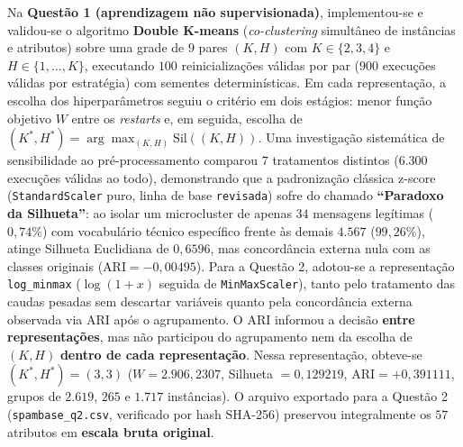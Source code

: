 \documentclass[a4paper,11pt]{article}
\begin{document}
Na \textbf{Questão 1 (aprendizagem não supervisionada)}, implementou-se e validou-se o algoritmo \textbf{Double K-means} (\textit{co-clustering} simultâneo de instâncias e atributos) sobre uma grade de $9$ pares $(K, H)$ com $K \in \{2, 3, 4\}$ e $H \in \{1, \ldots, K\}$, executando $100$ reinicializações válidas por par ($900$ execuções válidas por estratégia) com sementes determinísticas. Em cada representação, a escolha dos hiperparâmetros seguiu o critério em dois estágios: menor função objetivo $W$ entre os \textit{restarts} e, em seguida, escolha de $(K^*, H^*) = \arg\max_{(K,H)} \text{Sil}((K,H))$. Uma investigação sistemática de sensibilidade ao pré-processamento comparou $7$ tratamentos distintos ($6.300$ execuções válidas ao todo), demonstrando que a padronização clássica z-score (\texttt{StandardScaler} puro, linha de base \texttt{revisada}) sofre do chamado \textbf{``Paradoxo da Silhueta''}: ao isolar um microcluster de apenas $34$ mensagens legítimas ($0,74\%$) com vocabulário técnico específico frente às demais $4.567$ ($99,26\%$), atinge Silhueta Euclidiana de $0,6596$, mas concordância externa nula com as classes originais ($\text{ARI} = -0,00495$). Para a Questão 2, adotou-se a representação \texttt{log\_\allowbreak minmax} ($\log(1+x)$ seguida de \texttt{MinMaxScaler}), tanto pelo tratamento das caudas pesadas sem descartar variáveis quanto pela concordância externa observada via ARI após o agrupamento. O ARI informou a decisão \textbf{entre representações}, mas não participou do agrupamento nem da escolha de $(K,H)$ \textbf{dentro de cada representação}. Nessa representação, obteve-se $(K^*, H^*) = (3, 3)$ ($W = 2.906,2307$, Silhueta $= 0,129219$, $\text{ARI} = +0,391111$, grupos de $2.619$, $265$ e $1.717$ instâncias). O arquivo exportado para a Questão 2 (\texttt{spambase\_\allowbreak q2.csv}, verificado por hash SHA-256) preservou integralmente os $57$ atributos em \textbf{escala bruta original}.
\end{document}
